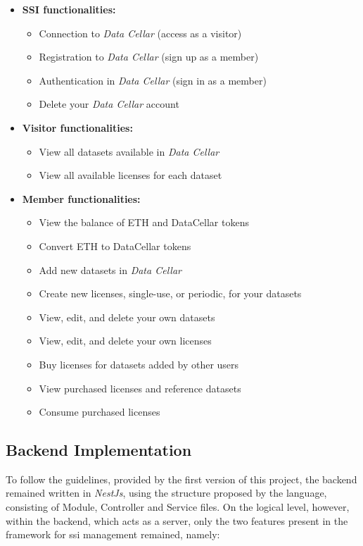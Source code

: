 \begin{itemize}
  \item \textbf{SSI functionalities:}
  \begin{itemize}
      \item Connection to \textit{Data Cellar} (access as a visitor)
      \item Registration to \textit{Data Cellar} (sign up as a member)
      \item Authentication in \textit{Data Cellar} (sign in as a member)
      \item Delete your \textit{Data Cellar} account
  \end{itemize}
  
  \item \textbf{Visitor functionalities:}
  \begin{itemize}
      \item View all datasets available in \textit{Data Cellar}
      \item View all available licenses for each dataset
  \end{itemize}
  
  \item \textbf{Member functionalities:}
  \begin{itemize}
      \item View the balance of ETH and DataCellar tokens
      \item Convert ETH to DataCellar tokens
      \item Add new datasets in \textit{Data Cellar}
      \item Create new licenses, single-use, or periodic, for your datasets
      \item View, edit, and delete your own datasets
      \item View, edit, and delete your own licenses
      \item Buy licenses for datasets added by other users
      \item View purchased licenses and reference datasets
      \item Consume purchased licenses
  \end{itemize}
\end{itemize}

\subsection{Backend Implementation}

To follow the guidelines, provided by the first version of this project, the backend remained written in \textit{NestJs}, using the structure proposed by the language, consisting of 
Module, Controller and Service files. On the logical level, however, within the backend, which acts as a server, only the two features present in the framework for \gls{ssi} 
management remained, namely:

